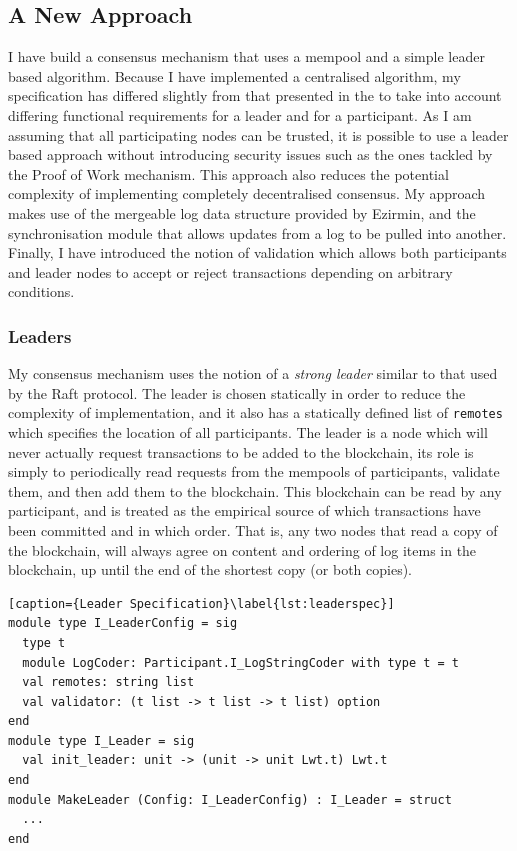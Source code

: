 \documentclass[12pt,a4paper,twoside,openright]{report}
\begin{document}
		\subsection{A New Approach}
		I have build a consensus mechanism that uses a mempool and a simple leader based algorithm. 
		Because I have implemented a centralised algorithm, my specification has differed slightly from that presented in the  to take into account differing functional requirements for a leader and for a participant.
		As I am assuming that all participating nodes can be trusted, it is possible to use a leader based approach without introducing security issues such as the ones tackled by the Proof of Work mechanism. 
		This approach also reduces the potential complexity of implementing completely decentralised consensus.
		My approach makes use of the mergeable log data structure provided by Ezirmin, and the synchronisation module that allows updates from a log to be pulled into another.
		Finally, I have introduced the notion of validation which allows both participants and leader nodes to accept or reject transactions depending on arbitrary conditions.
		
			\subsubsection*{Leaders}
			My consensus mechanism uses the notion of a \textit{strong leader} similar to that used by the Raft protocol. 
			The leader is chosen statically in order to reduce the complexity of implementation, and it also has a statically defined list of \texttt{remotes} which specifies the location of all participants.
			The leader is a node which will never actually request transactions to be added to the blockchain, its role is simply to periodically read requests from the mempools of participants, validate them, and then add them to the blockchain.
			This blockchain can be read by any participant, and is treated as the empirical source of which transactions have been committed and in which order. 
			That is, any two nodes that read a copy of the blockchain, will always agree on content and ordering of log items in the blockchain, up until the end of the shortest copy (or both copies).\\

			\begin{lstlisting}[caption={Leader Specification}\label{lst:leaderspec}]
module type I_LeaderConfig = sig
  type t
  module LogCoder: Participant.I_LogStringCoder with type t = t    
  val remotes: string list
  val validator: (t list -> t list -> t list) option
end
module type I_Leader = sig
  val init_leader: unit -> (unit -> unit Lwt.t) Lwt.t
end
module MakeLeader (Config: I_LeaderConfig) : I_Leader = struct
  ...
end
			\end{lstlisting}
\end{document}
